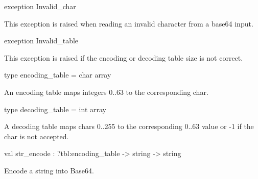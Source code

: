 \documentclass[11pt]{article}
\begin{document}
\label{exception:XmlRpcBase64.Invalid-underscorechar}\begin{ocamldoccode}
exception Invalid_char
\end{ocamldoccode}
\begin{ocamldocdescription}
This exception is raised when reading an invalid character
	from a base64 input.


\end{ocamldocdescription}




\label{exception:XmlRpcBase64.Invalid-underscoretable}\begin{ocamldoccode}
exception Invalid_table
\end{ocamldoccode}
\begin{ocamldocdescription}
This exception is raised if the encoding or decoding table
	size is not correct.


\end{ocamldocdescription}




\label{type:XmlRpcBase64.encoding-underscoretable}\begin{ocamldoccode}
type encoding_table = char array 
\end{ocamldoccode}
\begin{ocamldocdescription}
An encoding table maps integers 0..63 to the corresponding char.


\end{ocamldocdescription}




\label{type:XmlRpcBase64.decoding-underscoretable}\begin{ocamldoccode}
type decoding_table = int array 
\end{ocamldoccode}
\begin{ocamldocdescription}
A decoding table maps chars 0..255 to the corresponding 0..63 value
 or -1 if the char is not accepted.


\end{ocamldocdescription}




\label{val:XmlRpcBase64.str-underscoreencode}\begin{ocamldoccode}
val str_encode : ?tbl:encoding_table -> string -> string
\end{ocamldoccode}
\begin{ocamldocdescription}
Encode a string into Base64.


\end{ocamldocdescription}
\end{document}
